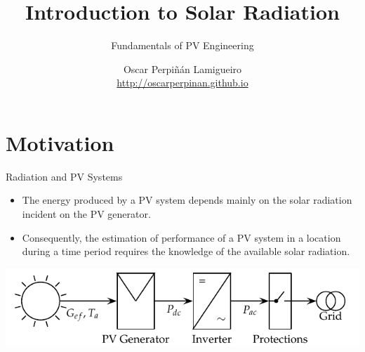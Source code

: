 \documentclass[xcolor={usenames,svgnames,dvipsnames}]{beamer}
\author{Oscar Perpiñán Lamigueiro \\ \url{http://oscarperpinan.github.io}}
\date{}
\title{Introduction to Solar Radiation}
\subtitle{Fundamentals of PV Engineering}
\begin{document}
\maketitle

\section{Motivation}
\label{sec:org01fddca}

\begin{frame}[label={sec:org209381e}]{Radiation and PV Systems}
\begin{itemize}
\item The energy produced by a PV system depends mainly on the solar radiation incident on the PV generator.

\item Consequently, the estimation of performance of a PV system in a location during a time period requires the knowledge of the available solar radiation.
\end{itemize}

\begin{center}
\includegraphics[width=.9\linewidth]{../figs/GCPVScheme.pdf}
\end{center}
\end{frame}
\end{document}
